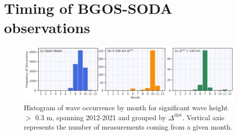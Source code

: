 \documentclass [11pt, proquest] {uwthesis}[2020/02/24]
\begin{document}
\section{Timing of BGOS-SODA observations}
\begin{figure}[H]
    \noindent\includegraphics[width=1.0\textwidth]{months_02.png}
    \caption{Histogram of wave occurrence by month for significant wave height $>$ 0.3 m, spanning 2012-2021 and grouped by $\Delta^{\mathrm{dist}}$. Vertical axis represents the number of measurements coming from a given month.}
    \label{SI:months}
\end{figure}

%
% 
% 
\printbibliography[heading=bibintoc,title={Bibliography}]
\end{document}
